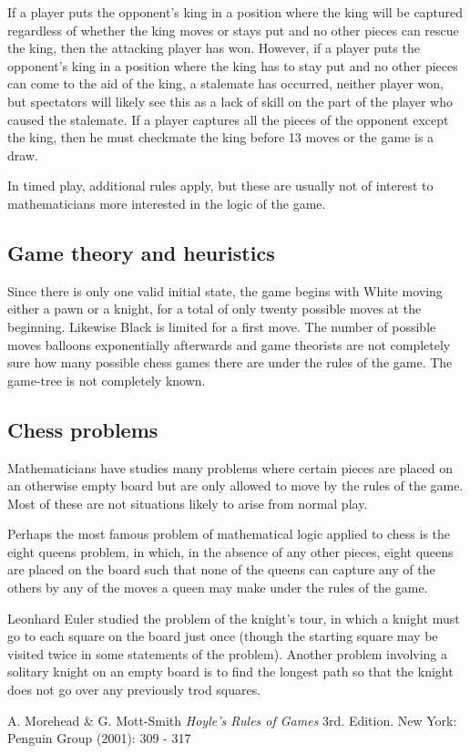 \documentclass[12pt]{article}
\begin{document}
If a player puts the opponent's king in a position where the king will be captured regardless of whether the king moves or stays put and no other pieces can rescue the king, then the attacking player has won. However, if a player puts the opponent's king in a position where the king has to stay put and no other pieces can come to the aid of the king, a stalemate has occurred, neither player won, but spectators will likely see this as a lack of skill on the part of the player who caused the stalemate. If a player captures all the pieces of the opponent except the king, then he must checkmate the king before 13 moves or the game is a draw.

In timed play, additional rules apply, but these are usually not of interest to mathematicians more interested in the logic of the game.

\subsection{Game theory and heuristics}

Since there is only one valid initial state, the game begins with White moving either a pawn or a knight, for a total of only twenty possible moves at the beginning. Likewise Black is limited for a first move. The number of possible moves balloons exponentially afterwards and game theorists are not completely sure how many possible chess games there are under the rules of the game. The game-tree is not completely known.

\subsection{Chess problems}

Mathematicians have studies many problems where certain pieces are placed on an otherwise empty board but are only allowed to move by the rules of the game. Most of these are not situations likely to arise from normal play.

Perhaps the most famous problem of mathematical logic applied to chess is the eight queens problem, in which, in the absence of any other pieces, eight queens are placed on the board such that none of the queens can capture any of the others by any of the moves a queen may make under the rules of the game.

Leonhard Euler studied the problem of the knight's tour, in which a knight must go to each square on the board just once (though the starting square may be visited twice in some statements of the problem). Another problem involving a solitary knight on an empty board is  to find the longest path so that the knight does not go over any previously trod squares.

\begin{thebibliography}{1}
 A. Morehead \& G. Mott-Smith {\it Hoyle's Rules of Games} 3rd. Edition. New York: Penguin Group (2001): 309 - 317
\end{thebibliography}
\end{document}
